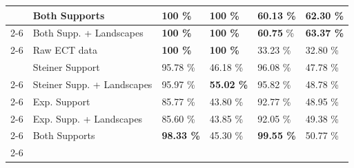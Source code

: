 \documentclass[a4paper]{article}
\begin{document}
\begin{table}[]
\begin{tabular}{cl|l|l|l|l|}
 			\multicolumn{1}{|c|}{}                               & Both Supports              & \textbf{100 \%}   & \textbf{100 \%}                                            & 60.13 \%                                       & 62.30 \%                                                      \\ \cline{2-6} 
 			\multicolumn{1}{|c|}{}                               & Both Supp. + Landscapes    & \textbf{100 \%}   & \textbf{100 \%}                                            & \textbf{60.75} \%                                                & \textbf{63.37 \%}                                             \\ \cline{2-6} 
 			\multicolumn{1}{|c|}{}                               & Raw ECT data               & \textbf{100 \%}   & \textbf{100 \%}                                            & 33.23 \%                                                & 32.80 \%                                                       \\ \hhline{|=|=|=|=|=|=|}
 			\multicolumn{1}{|c|}{\multirow{7}{*}{Type test}}     & Steiner Support            & 95.78 \%          & 46.18 \%                                                   & 96.08 \%                                                & 47.78 \%                                                      \\ \cline{2-6} 
 			\multicolumn{1}{|c|}{}                               & Steiner Supp. + Landscapes & 95.97 \%          & \textbf{55.02 \%}                                          & 95.82 \%                                                & 48.78 \%                                                      \\ \cline{2-6} 
 			\multicolumn{1}{|c|}{}                               & Exp. Support               & 85.77 \%          & 43.80 \%                                                   & 92.77 \%                                                & 48.95 \%                                                      \\ \cline{2-6} 
 			\multicolumn{1}{|c|}{}                               & Exp. Supp. + Landscapes    & 85.60 \%          & 43.85 \%                                                   & 92.05 \%                                                & 49.38 \%                                                      \\ \cline{2-6} 
 			\multicolumn{1}{|c|}{}                               & Both Supports              & \textbf{98.33 \%} & 45.30 \%                                                   & \textbf{99.55 \%}                                       & 50.77 \%                                                      \\ \cline{2-6} 

\end{tabular}
\end{table}
\end{document}
